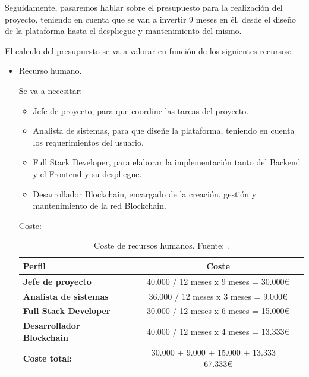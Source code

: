 Seguidamente, pasaremos hablar sobre el presupuesto para la realización del proyecto, teniendo en cuenta que se van a 
invertir 9 meses en él, desde el diseño de la plataforma hasta el despliegue y mantenimiento del mismo.

El calculo del presupuesto se va a valorar en función de los siguientes recursos:

\begin{itemize}
  \item Recurso humano.
  
  Se va a necesitar: 
  
  \begin{itemize}
    \item Jefe de proyecto, para que coordine las tareas del proyecto.
    \item Analista de sistemas, para que diseñe la plataforma, teniendo en cuenta los requerimientos del usuario.
    \item Full Stack Developer, para elaborar la implementación tanto del Backend y el Frontend y su despliegue.
    \item Desarrollador Blockchain, encargado de la creación, gestión y mantenimiento de la red Blockchain.
  \end{itemize}

  Coste:

  \begin{table}[h!]
    \centering
    \begin{tabular}{|l|c|}
        \hline
        \textbf{Perfil}                     &   \textbf{Coste} \\
        \hline 
        \hline
        \textbf{Jefe de proyecto}           &   40.000 / 12 meses x 9 meses = 30.000€ \\ 
        \hline 
        \textbf{Analista de sistemas}       &   36.000 / 12 meses x 3 meses = 9.000€ \\ 
        \hline
        \textbf{Full Stack Developer}       &   30.000 / 12 meses x 6 meses = 15.000€ \\ 
        \hline
        \textbf{Desarrollador Blockchain}   &   40.000 / 12 meses x 4 meses = 13.333€ \\ 
        \hline
        \textbf{Coste total:}               &   30.000 + 9.000 + 15.000 + 13.333 = 67.333€ \\ 
        \hline
    \end{tabular}
    
    \caption{Coste de recursos humanos. Fuente: \cite{info-jobs}.}
    \label{table:coste-recurso-humanos}
  \end{table}



\end{itemize}
